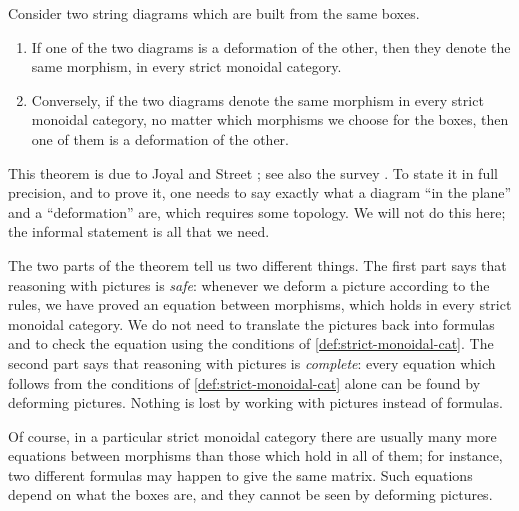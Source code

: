 \begin{theorem}
    \label{thm:string-diagrams-joyal-street}
    Consider two string diagrams which are built from the same boxes.
    \begin{enumerate}
        \item If one of the two diagrams is a deformation of the other, then they denote the same morphism, in every strict monoidal category.
        \item Conversely, if the two diagrams denote the same morphism in every strict monoidal category, no matter which morphisms we choose for the boxes, then one of them is a deformation of the other.
    \end{enumerate}
\end{theorem}

This theorem is due to Joyal and Street \cite{joyal1991geometry}; see also the survey \cite{selinger2011survey}.
To state it in full precision, and to prove it, one needs to say exactly what a diagram ``in the plane'' and a ``deformation'' are, which requires some topology.
We will not do this here; the informal statement is all that we need.

The two parts of the theorem tell us two different things.
The first part says that reasoning with pictures is \emph{safe}: whenever we deform a picture according to the rules, we have proved an equation between morphisms, which holds in every strict monoidal category.
We do not need to translate the pictures back into formulas and to check the equation using the conditions of \cref{def:strict-monoidal-cat}.
The second part says that reasoning with pictures is \emph{complete}: every equation which follows from the conditions of \cref{def:strict-monoidal-cat} alone can be found by deforming pictures.
Nothing is lost by working with pictures instead of formulas.

Of course, in a particular strict monoidal category there are usually many more equations between morphisms than those which hold in all of them; for instance, two different formulas may happen to give the same matrix.
Such equations depend on what the boxes are, and they cannot be seen by deforming pictures.

